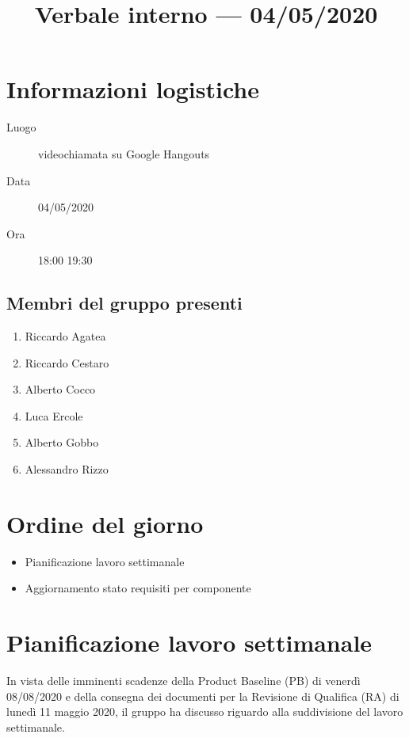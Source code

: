 \documentclass{article}
\title{Verbale interno --- 04/05/2020}
\begin{document}


\section{Informazioni logistiche}%
\label{sec:informazioni_logistiche}

\begin{description}
  \item [Luogo] videochiamata su Google Hangouts
  \item [Data] 04/05/2020
  \item [Ora] 18:00  19:30
\end{description}

\subsection{Membri del gruppo presenti}%
\label{sub:membri_del_gruppo_presenti}

\begin{enumerate}
  \item Riccardo Agatea
  \item Riccardo Cestaro
  \item Alberto Cocco
  \item Luca Ercole
  \item Alberto Gobbo
  \item Alessandro Rizzo
\end{enumerate}

\section{Ordine del giorno}%
\label{sec:ordine_del_giorno}

\begin{itemize}
  \item Pianificazione lavoro settimanale
  \item Aggiornamento stato requisiti per componente
\end{itemize}

\section{Pianificazione lavoro settimanale}%
\label{sec:pianificazione_lavoro_settimanale}

In vista delle imminenti scadenze della Product Baseline (PB) di venerdì 08/08/2020 e della consegna dei documenti per la Revisione di Qualifica (RA) di lunedì 11 maggio 2020, il gruppo ha discusso riguardo alla suddivisione del lavoro settimanale.
\end{document}
